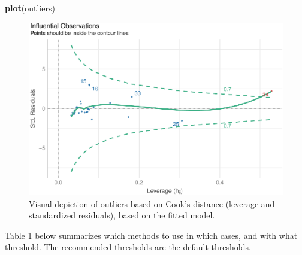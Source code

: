 \documentclass{article}
\newenvironment{Shaded}{\begin{snugshade}}{\end{snugshade}}
\newcommand{\FunctionTok}[1]{\textcolor[rgb]{0.13,0.29,0.53}{\textbf{#1}}}
\newcommand{\NormalTok}[1]{#1}
\begin{document}
\begin{Shaded}
\begin{Highlighting}[]
\FunctionTok{plot}\NormalTok{(outliers)}
\end{Highlighting}
\end{Shaded}

\begin{figure}
\includegraphics[width=1\linewidth]{paper_files/figure-latex/model_fig-1} \caption{Visual depiction of outliers based on Cook's distance (leverage and standardized residuals), based on the fitted model.}\label{fig:model_fig}
\end{figure}

Table 1 below summarizes which methods to use in which cases, and with
what threshold. The recommended thresholds are the default thresholds.
\end{document}

